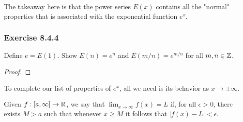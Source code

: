 The takeaway here is that the power series \( E(x)  \) contains all the "normal" properties that is associated with the exponential function \( e^{x} \). 

\subsubsection{Exercise 8.4.4} Define \( e = E(1)  \). Show \( E(n) = e^{n}  \) and \( E(m/n) = e^{m/n} \) for all \( m,n \in \mathbb{Z}  \).
\begin{proof}

\end{proof}

To complete our list of properties of \( e^{x}  \), all we need is its behavior as \( x \to \pm \infty  \).

\begin{definition}{}{}
    Given \( f : [a,\infty ]  \to \mathbb{R} \), we say that \( \lim_{ x \to \infty  }  f(x) = L  \) if, for all \( \epsilon > 0  \), there exists \( M > a  \) such that whenever \( x \geq M  \) it follows that \( |  f(x) - L  | < \epsilon  \).
\end{definition}





